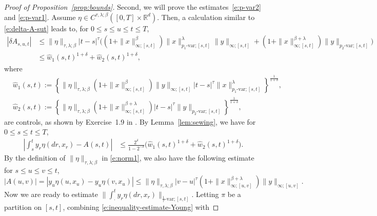 \documentclass[11pt,reqno]{amsart}
\numberwithin{equation}{section}
\begin{document}
\begin{proof}[Proof of Proposition~\ref{prop:bounds}]
Second, we will prove the estimates~\eqref{e:p-var2} and \eqref{e:p-var1}. Assume $\eta\in C^{\tau,\lambda;\beta}([0,T]\times\mathbb{R}^{d})$. Then, a calculation similar to \eqref{e:delta-A-sut} leads to, for  $0\le s\le u\le t\le T$,
\begin{equation*}
\begin{aligned}
\left|\delta A_{s,u,t}\right| & \le  \|\eta\|_{\tau,\lambda;\beta} |t - s|^{\tau} \Big((1+\|x\|^{\beta}_{\infty;[s,t]})\|x\|^{\lambda}_{p_{1}\text{-var};[s,t]}\|y\|_{\infty;[s,t]} + (1+\|x\|^{\beta+\lambda}_{\infty;[s,t]}) \|y\|_{p_{2}\text{-var};[s,t]} \Big)\\
&\le \hat{w}_1(s,t)^{1+\delta}+\hat{w}_2(s,t)^{1+\delta},	
\end{aligned}
\end{equation*}
where  
\begin{equation*}
\begin{aligned}
&\hat{w}_{1}(s,t):=\left\{\|\eta\|_{\tau,\lambda;\beta}(1+\|x\|^{\beta}_{\infty;[s,t]})\|y\|_{\infty;[s,t]} |t - s|^{\tau}\|x\|^{\lambda}_{p_{1}\text{-var};[s,t]}\right\}^{\frac{1}{1+\delta}},\\
& \hat{w}_{2}(s,t):=\left\{\|\eta\|_{\tau,\lambda;\beta}(1+\|x\|^{\beta+\lambda}_{\infty;[s,t]}) |t - s|^{\tau} \|y\|_{p_{2}\text{-var};[s,t]}\right\}^{\frac{1}{1+\delta}},
\end{aligned}
\end{equation*}
are controls, as shown by Exercise~1.9 in \cite{FrizVictoir}. By Lemma~\ref{lem:sewing}, we have for $0\le s\le t\le T$, 
\begin{equation}\label{e:inequality-estimate-Young}
\begin{aligned}
\left|\int_{s}^{t} y_{r} \eta(dr,x_{r}) - A(s,t)\right| &\le \frac{2^{\delta}}{1-2^{-\delta}}\Big(\hat{w}_1(s,t)^{1+\delta}+\hat{w}_2(s,t)^{1+\delta}\Big).
\end{aligned}
\end{equation}
By the definition of $\|\eta\|_{\tau,\lambda;\beta}$ in \eqref{e:norm1}, we also have the following estimate for  $s\le u\le v\le t$,
\begin{equation}\label{e:inequality-estimate-Young2}
|A(u,v)|=|y_u\eta(u,x_{u}) - y_u\eta(v,x_{u})|\le \|\eta\|_{\tau,\lambda;\beta}|v-u|^{\tau}\left(1+\|x\|^{\beta+\lambda}_{\infty;[u,v]}\right)\|y\|_{\infty;[u,v]}.
\end{equation}
Now we are ready to estimate $\|\int_{\cdot}^{t}y_{r}\eta(dr,x_{r})\|_{\frac{1}{\tau}\text{-var};[s,t]}$. 	Letting $\pi$ be a partition on $[s,t]$, combining \eqref{e:inequality-estimate-Young} with

\end{proof}
\end{document}
